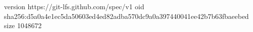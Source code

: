version https://git-lfs.github.com/spec/v1
oid sha256:d5a0a4e1ec5da50603ed4ed82adba570dc9a0a397440041ee42b7b63fbaeebed
size 1048672
